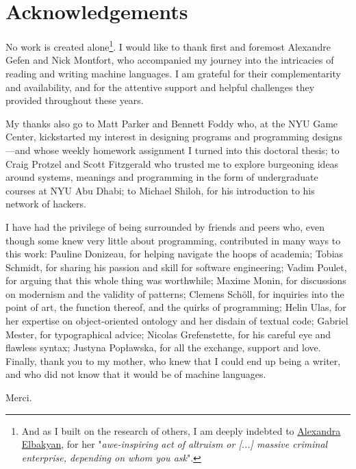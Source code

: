 \section*{Acknowledgements}

No work is created alone\footnote{And as I built on the research of others, I am deeply indebted to \href{https://en.wikipedia.org/wiki/Sci-Hub}{Alexandra Elbakyan}, for her "\emph{awe-inspiring act of altruism or [...] massive criminal enterprise, depending on whom you ask}".}. I would like to thank first and foremost Alexandre Gefen and Nick Montfort, who accompanied my journey into the intricacies of reading and writing machine languages. I am grateful for their complementarity and availability, and for the attentive support and helpful challenges they provided throughout these years.

My thanks also go to Matt Parker and Bennett Foddy who, at the NYU Game Center, kickstarted my interest in designing programs and programming designs—and whose weekly homework assignment I turned into this doctoral thesis; to Craig Protzel and Scott Fitzgerald who trusted me to explore burgeoning ideas around systems, meanings and programming in the form of undergraduate courses at NYU Abu Dhabi; to Michael Shiloh, for his introduction to his network of hackers.

I have had the privilege of being surrounded by friends and peers who, even though some knew very little about programming, contributed in many ways to this work: Pauline Donizeau, for helping navigate the hoops of academia; Tobias Schmidt, for sharing his passion and skill for software engineering; Vadim Poulet, for arguing that this whole thing was worthwhile; Maxime Monin, for discussions on modernism and the validity of patterns; Clemens Schöll, for inquiries into the point of art, the function thereof, and the quirks of programming; Helin Ulas, for her expertise on object-oriented ontology and her disdain of textual code; Gabriel Mester, for typographical advice; Nicolas Grefenstette, for his careful eye and flawless syntax; Justyna Popławska, for all the exchange, support and love. Finally, thank you to my mother, who knew that I could end up being a writer, and who did not know that it would be of machine languages.

Merci.
